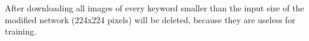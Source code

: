 \documentclass[../ImageClassifier.tex]{subfiles}
\begin{document}
    After downloading all images of every keyword smaller than the input size of the modified network (224x224 pixels) will be deleted, because they are useless for training.
\end{document}
